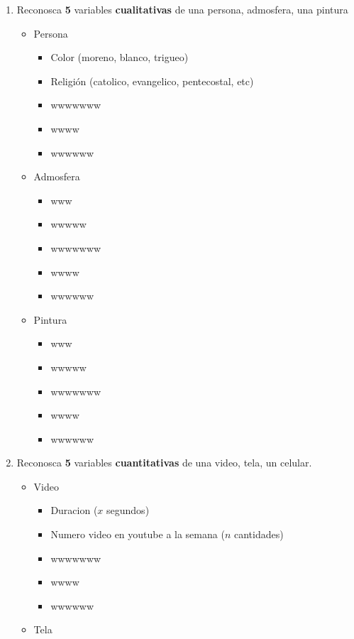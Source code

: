 \documentclass[
  10pt,
]{krantz}
\providecommand{\tightlist}{%
  \setlength{\itemsep}{0pt}\setlength{\parskip}{0pt}}
\theoremstyle{definition}
\theoremstyle{definition}
\theoremstyle{definition}
\theoremstyle{definition}
\theoremstyle{remark}
\begin{document}
\begin{enumerate}
\def\labelenumi{\arabic{enumi}.}
\item
  Reconosca \textbf{5} variables \textbf{cualitativas} de una persona, admosfera, una pintura

  \begin{itemize}
  \tightlist
  \item
    Persona

    \begin{itemize}
    \tightlist
    \item
      Color (moreno, blanco, trigueo)
    \item
      Religión (catolico, evangelico, pentecostal, etc)
    \item
      wwwwwww
    \item
      wwww
    \item
      wwwwww
    \end{itemize}
  \item
    Admosfera

    \begin{itemize}
    \tightlist
    \item
      www
    \item
      wwwww
    \item
      wwwwwww
    \item
      wwww
    \item
      wwwwww
    \end{itemize}
  \item
    Pintura

    \begin{itemize}
    \tightlist
    \item
      www
    \item
      wwwww
    \item
      wwwwwww
    \item
      wwww
    \item
      wwwwww
    \end{itemize}
  \end{itemize}
\item
  Reconosca \textbf{5} variables \textbf{cuantitativas} de una video, tela, un celular.

  \begin{itemize}
  \tightlist
  \item
    Video

    \begin{itemize}
    \tightlist
    \item
      Duracion (\(x\) segundos)
    \item
      Numero video en youtube a la semana (\(n\) cantidades)
    \item
      wwwwwww
    \item
      wwww
    \item
      wwwwww
    \end{itemize}
  \item
    Tela


\end{itemize}
\end{enumerate}
\end{document}
